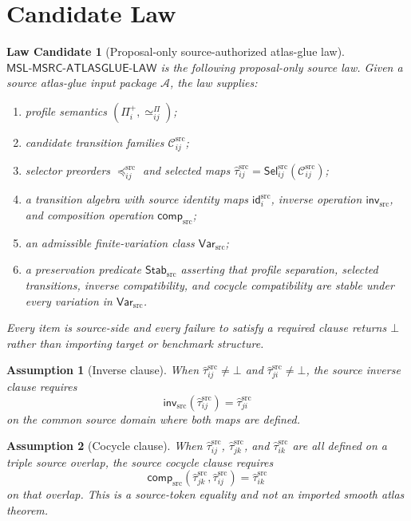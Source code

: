 \documentclass[11pt]{article}
\newcommand{\MSL}{\mathsf{MSL}\mbox{-}\mathsf{MSRC}\mbox{-}\mathsf{ATLASGLUE}\mbox{-}\mathsf{LAW}}
\newcommand{\Prof}{\Pi^{+}}
\newcommand{\Cand}{\mathcal{C}^{\mathrm{src}}}
\newcommand{\Sel}{\mathsf{Sel}^{\mathrm{src}}}
\newcommand{\Tau}{\widehat{\tau}^{\mathrm{src}}}
\newcommand{\Var}{\mathsf{Var}_{\mathrm{src}}}
\newcommand{\Stab}{\mathsf{Stab}_{\mathrm{src}}}
\newcommand{\Bot}{\bot}
\newtheorem{law}{Law Candidate}
\newtheorem{assumption}{Assumption}
\begin{document}
\section{Candidate Law}

\begin{law}[Proposal-only source-authorized atlas-glue law]
\(\MSL\) is the following proposal-only source law. Given a source atlas-glue
input package \(\mathcal A\), the law supplies:
\begin{enumerate}
  \item profile semantics \((\Prof_i,\simeq^\Pi_{ij})\);
  \item candidate transition families \(\Cand_{ij}\);
  \item selector preorders \(\preceq^{\mathrm{src}}_{ij}\) and selected maps
  \(\Tau_{ij}=\Sel_{ij}(\Cand_{ij})\);
  \item a transition algebra with source identity maps
  \(\mathsf{id}^{\mathrm{src}}_i\), inverse operation
  \(\mathsf{inv}_{\mathrm{src}}\), and composition operation
  \(\mathsf{comp}_{\mathrm{src}}\);
  \item an admissible finite-variation class \(\Var\);
  \item a preservation predicate \(\Stab\) asserting that profile separation,
  selected transitions, inverse compatibility, and cocycle compatibility are
  stable under every variation in \(\Var\).
\end{enumerate}
Every item is source-side and every failure to satisfy a required clause
returns \(\Bot\) rather than importing target or benchmark structure.
\end{law}

\begin{assumption}[Inverse clause]
When \(\Tau_{ij}\neq\Bot\) and \(\Tau_{ji}\neq\Bot\), the source inverse
clause requires
\[
  \mathsf{inv}_{\mathrm{src}}(\Tau_{ij})=\Tau_{ji}
\]
on the common source domain where both maps are defined.
\end{assumption}

\begin{assumption}[Cocycle clause]
When \(\Tau_{ij}\), \(\Tau_{jk}\), and \(\Tau_{ik}\) are all defined on a
triple source overlap, the source cocycle clause requires
\[
  \mathsf{comp}_{\mathrm{src}}(\Tau_{jk},\Tau_{ij})=\Tau_{ik}
\]
on that overlap. This is a source-token equality and not an imported smooth
atlas theorem.
\end{assumption}
\end{document}
